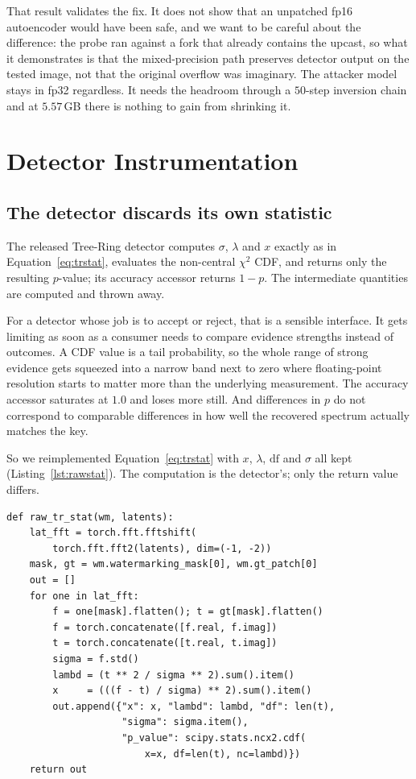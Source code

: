 \documentclass[10pt,twocolumn]{article}
\newcommand{\xstat}{\ensuremath{x}}
\newcommand{\lam}{\ensuremath{\lambda}}
\begin{document}
That result validates the fix. It does not show that an unpatched fp16 autoencoder
would have been safe, and we want to be careful about the difference: the probe ran
against a fork that already contains the upcast, so what it demonstrates is that the
mixed-precision path preserves detector output on the tested image, not that the
original overflow was imaginary. The attacker model stays in fp32 regardless. It needs
the headroom through a $50$-step inversion chain and at $5.57$\,GB there is nothing to
gain from shrinking it.
\section{Detector Instrumentation}
\label{sec:instr}

\subsection{The detector discards its own statistic}

The released Tree-Ring detector computes $\sigma$, $\lam$ and $\xstat$ exactly as in
Equation~\ref{eq:trstat}, evaluates the non-central $\chi^2$ CDF, and returns only the
resulting $p$-value; its accuracy accessor returns $1 - p$. The intermediate
quantities are computed and thrown away.

For a detector whose job is to accept or reject, that is a sensible interface. It gets
limiting as soon as a consumer needs to compare evidence strengths instead of
outcomes. A CDF value is a tail probability, so the whole range of strong evidence
gets squeezed into a narrow band next to zero where floating-point resolution starts
to matter more than the underlying measurement. The accuracy accessor saturates at
$1.0$ and loses more still. And differences in $p$ do not correspond to comparable
differences in how well the recovered spectrum actually matches the key.

So we reimplemented Equation~\ref{eq:trstat} with $\xstat$, $\lam$, $\mathrm{df}$ and
$\sigma$ all kept (Listing~\ref{lst:rawstat}). The computation is the detector's; only
the return value differs.

\begin{lstlisting}[caption={Recovering the discarded statistic. The arithmetic mirrors
the released detector; the intermediates are kept rather than collapsed into a
CDF.},label=lst:rawstat]
def raw_tr_stat(wm, latents):
    lat_fft = torch.fft.fftshift(
        torch.fft.fft2(latents), dim=(-1, -2))
    mask, gt = wm.watermarking_mask[0], wm.gt_patch[0]
    out = []
    for one in lat_fft:
        f = one[mask].flatten(); t = gt[mask].flatten()
        f = torch.concatenate([f.real, f.imag])
        t = torch.concatenate([t.real, t.imag])
        sigma = f.std()
        lambd = (t ** 2 / sigma ** 2).sum().item()
        x     = (((f - t) / sigma) ** 2).sum().item()
        out.append({"x": x, "lambd": lambd, "df": len(t),
                    "sigma": sigma.item(),
                    "p_value": scipy.stats.ncx2.cdf(
                        x=x, df=len(t), nc=lambd)})
    return out
\end{lstlisting}
\end{document}
